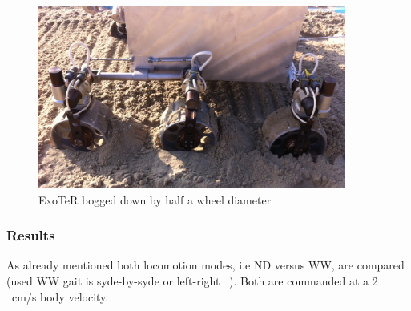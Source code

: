 \documentclass[a4paper,twocolumn]{esapub2005} %
\begin{document}
\begin{figure}[h!]
    \centering
    \includegraphics[width=0.9\textwidth]{volleyexoterdigg.jpg}
    \caption{ExoTeR bogged down by half a wheel diameter}
    \label{fig:volleyexoterdigg}
\end{figure}

\subsubsection{Results} As already mentioned both locomotion modes, i.e ND versus WW, are compared (used WW gait is syde-by-syde or left-right ~\cite{LucWalkingGaits}). Both are commanded at a 2 ~\unit{cm/s}
body velocity.
\end{document}

